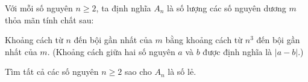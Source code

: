 \ifshowproblem
\begin{problem}[\gls{BW 2015}/P20]\label{example:BW-2015-P20}
    Với mỗi số nguyên \( n \ge 2 \), ta định nghĩa \( A_n \) là số lượng các số nguyên dương \( m \) thỏa mãn tính chất sau:

    Khoảng cách từ \( n \) đến bội gần nhất của \( m \) bằng khoảng cách từ \( n^3 \) đến bội gần nhất của \( m \).  
    (Khoảng cách giữa hai số nguyên \( a \) và \( b \) được định nghĩa là \( |a - b| \).)

    Tìm tất cả các số nguyên \( n \ge 2 \) sao cho \( A_n \) là số lẻ.
\end{problem}
\fi

\footnotemark
{}
\fi